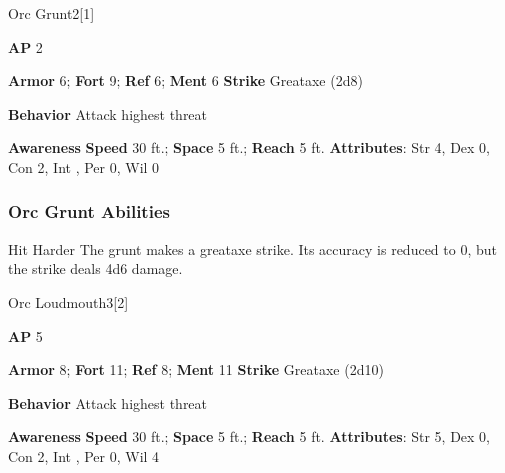 \begin{monsection}{Orc Grunt}{2}[1]
\vspace{-1em}\vspace{-1em}
\begin{spellcontent}
\begin{spelltargetinginfo}
{\textbf{AP} 2}

\pari \textbf{Armor} 6;
\textbf{Fort} 9;
\textbf{Ref} 6;
\textbf{Ment} 6
\pari \textbf{Strike} Greataxe  (2d8)



\pari \textbf{Behavior} Attack highest threat
\end{spelltargetinginfo}
\end{spellcontent}

\begin{monsterfooter}
\pari \textbf{Awareness} 
\pari \textbf{Speed} 30 ft.;
\textbf{Space} 5 ft.;
\textbf{Reach} 5 ft.
\pari \textbf{Attributes}:
Str 4,
Dex 0,
Con 2,
Int ,
Per 0,
Wil 0
\end{monsterfooter}
\end{monsection}


\subsubsection{Orc Grunt Abilities}

\begin{freeability}{Hit Harder}
The grunt makes a greataxe strike.
Its accuracy is reduced to 0, but the strike deals 4d6 damage.
\end{freeability}

\begin{monsection}{Orc Loudmouth}{3}[2]
\vspace{-1em}\vspace{-1em}
\begin{spellcontent}
\begin{spelltargetinginfo}
{\textbf{AP} 5}

\pari \textbf{Armor} 8;
\textbf{Fort} 11;
\textbf{Ref} 8;
\textbf{Ment} 11
\pari \textbf{Strike} Greataxe  (2d10)



\pari \textbf{Behavior} Attack highest threat
\end{spelltargetinginfo}
\end{spellcontent}

\begin{monsterfooter}
\pari \textbf{Awareness} 
\pari \textbf{Speed} 30 ft.;
\textbf{Space} 5 ft.;
\textbf{Reach} 5 ft.
\pari \textbf{Attributes}:
Str 5,
Dex 0,
Con 2,
Int ,
Per 0,
Wil 4
\end{monsterfooter}
\end{monsection}


